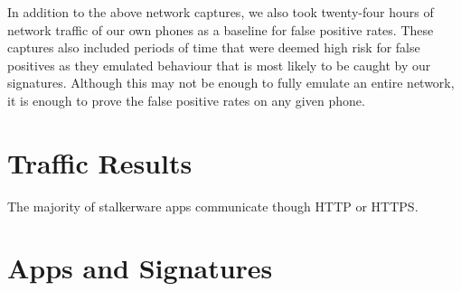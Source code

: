 \documentclass[acmtog]{acmart}
\begin{document}
In addition to the above network captures, we also took twenty-four hours of 
network traffic of our own phones as a baseline for false positive rates. These 
captures also included periods of time that were deemed high risk for false 
positives as they emulated behaviour that is most likely to be caught by our 
signatures. Although this may not be enough to fully emulate an entire network, 
it is enough to prove the false positive rates on any given phone.

\section{Traffic Results}

The majority of stalkerware apps communicate though HTTP or HTTPS.





%



% 
\appendix

\section{Apps and Signatures}
\end{document}
